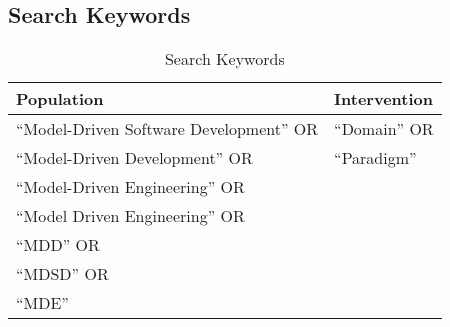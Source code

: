 \documentclass[10pt,twocolumn]{article}
\begin{document}
\newpage
\begin{appendices}
\section{Search Keywords}
\begin{table}[Ht*]
	\centering
	\begin{tabular}{|l|l|} 
		\hline
		\textbf{Population} & \textbf{Intervention}  \\
		\hline
		``Model-Driven Software Development'' OR & ``Domain'' OR \\ 
		``Model-Driven Development'' OR & ``Paradigm'' \\
		``Model-Driven Engineering'' OR & \\
		``Model Driven Engineering'' OR & \\
		``MDD'' OR & \\
		``MDSD'' OR & \\
		``MDE'' & \\
		\hline
		\end{tabular}
	\caption{Search Keywords}
\end{table}
\end{appendices}
\end{document}
